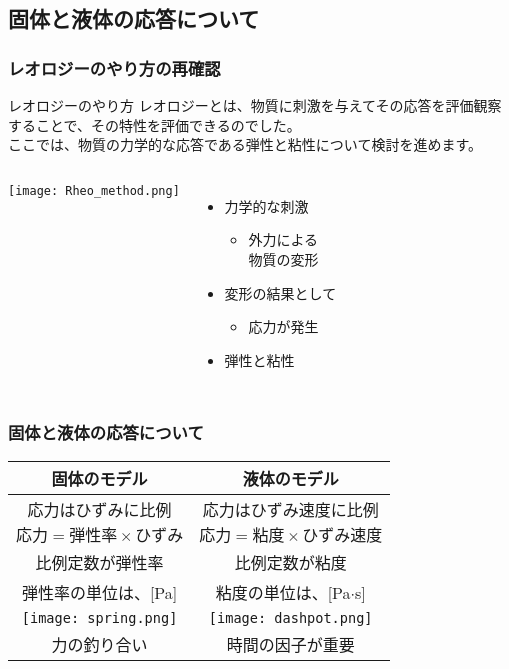 \documentclass[12pt, dvipdfmx]{beamer}
\begin{document}
\subsection{固体と液体の応答について}
\begin{frame}
	\frametitle{レオロジーのやり方の再確認}
	\begin{block}{レオロジーのやり方}
		レオロジーとは、物質に刺激を与えてその応答を評価観察することで、その特性を評価できるのでした。\\
		ここでは、物質の力学的な応答である弾性と粘性について検討を進めます。
	\end{block}
	\begin{columns}[T, onlytextwidth]
			\texttt{[image: Rheo\_method.png]}
			\begin{itemize}
				\item 力学的な刺激
				\begin{itemize}
					\item 外力による\\物質の変形
				\end{itemize}
				\item 変形の結果として
				\begin{itemize}
					\item 応力が発生
				\end{itemize}
				\item 弾性と粘性
			\end{itemize}
	\end{columns}
\end{frame}

\begin{frame}
	\frametitle{固体と液体の応答について}
			\begin{center}
				\begin{tabular}{|c||c|} \hline
					固体のモデル	& 液体のモデル \\ \hline \hline
					応力は\alert{ひずみに比例}	& 応力は\alert{ひずみ速度に比例}\\
					$\text{応力} = \text{弾性率} \times \text{ひずみ}$	& $\text{応力} = \text{粘度} \times \text{ひずみ速度}$ \\ \hline
					比例定数が弾性率	& 比例定数が粘度\\ 
					弾性率の単位は、[Pa]	& 粘度の単位は、[Pa$\cdot$s]\\ \hline
					\texttt{[image: spring.png]} & \texttt{[image: dashpot.png]} \\ \hline
					\alert{力の釣り合い}	& 	\alert{時間の因子が重要} \\ \hline
				\end{tabular}
			\end{center}
\end{frame}
\end{document}
